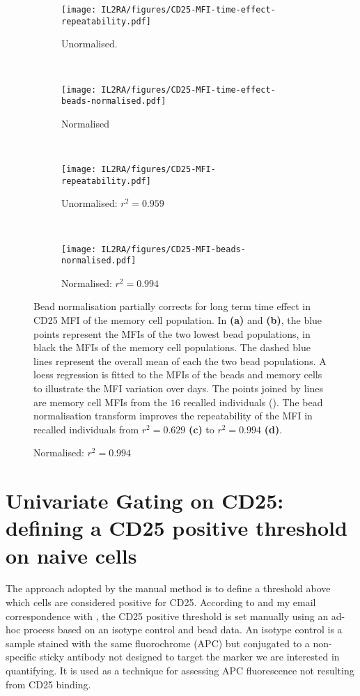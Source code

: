\begin{figure}[ht]
\centering
\begin{subfigure}[b]{.4\textwidth}
    \centering
    \texttt{[image: IL2RA/figures/CD25-MFI-time-effect-repeatability.pdf]}
    \caption{Unormalised.}
\end{subfigure}
~
\begin{subfigure}[b]{.4\textwidth}
    \centering
    \texttt{[image: IL2RA/figures/CD25-MFI-time-effect-beads-normalised.pdf]}
    \caption{Normalised}
\end{subfigure}
~
\begin{subfigure}[b]{.4\textwidth}
    \centering
    \texttt{[image: IL2RA/figures/CD25-MFI-repeatability.pdf]}
    \caption{Unormalised: $r^2=0.959$}
\end{subfigure}
~
\begin{subfigure}[b]{.4\textwidth}
    \centering
    \texttt{[image: IL2RA/figures/CD25-MFI-beads-normalised.pdf]}
    \caption{Normalised: $r^2=0.994$}
\end{subfigure}
{Bead normalisation partially corrects for long term time effect in CD25 MFI of the memory cell population.}
{
  In \textbf{(a)} and \textbf{(b)}, the blue points represent the  MFIs of the two lowest bead populations,
  in black the  MFIs of the memory cell populations.
  The dashed blue lines represent the overall mean of each the two bead populations.
  A loess regression is fitted to the MFIs of the beads and memory cells to illustrate the MFI variation over days.
  The points joined by lines are memory cell  MFIs from the $16$ recalled individuals ().
  The bead normalisation transform  improves the repeatability of the MFI in recalled individuals from $r^2=0.629$ \textbf{(c)} to $r^2=0.994$ \textbf{(d)}.
}
\end{figure}




\section{Univariate Gating on CD25: defining a CD25 positive threshold on naive cells}

The approach adopted by the manual method is to define a threshold above which cells are considered positive for CD25.
According to \citet{Dendrou:2009bl} and my email correspondence with ,
the CD25 positive threshold is set manually using an ad-hoc process based on an isotype control and bead data.
An isotype control is a sample stained with the same fluorochrome (APC) but conjugated to a
non-specific sticky antibody not designed to target the marker we are interested in quantifying.
It is used as a technique for assessing APC fluorescence not resulting from CD25 binding.

